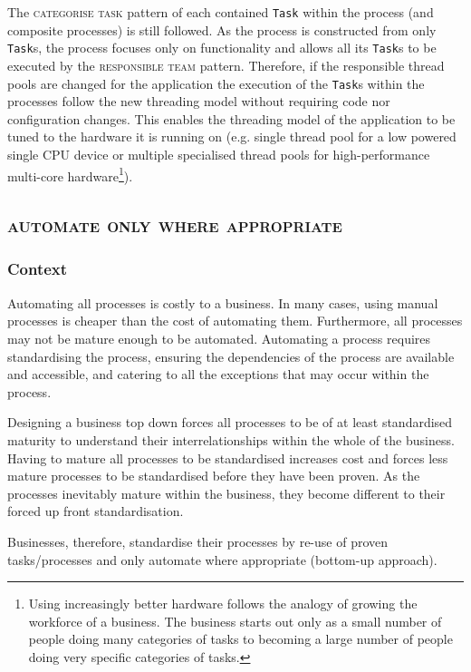 \documentclass[prodmode]{style/acmlarge}
\begin{document}
The \textsc{categorise task} pattern of each contained \texttt{Task} within the
process (and composite processes) is still followed.  As the process is
constructed from only \texttt{Task}s, the process focuses only on functionality
and allows all its \texttt{Task}s to be executed by the \textsc{responsible
team} pattern.  Therefore, if the responsible thread pools are changed for the
application the execution of the \texttt{Task}s within the processes follow the new
threading model without requiring code nor configuration changes.  This enables
the threading model of the application to be tuned to the hardware it is running
on (e.g. single thread pool for a low powered single CPU device or multiple
specialised thread pools for high-performance multi-core hardware\footnote{Using
increasingly better hardware follows the analogy of growing the workforce of a
business.  The business starts out only as a small number of people doing many
categories of tasks to becoming a large number of people doing very specific
categories of tasks.}).



\subsection{\textsc{\textbf{automate only where appropriate}}}

\subsubsection*{Context} Automating all processes is costly to a business.  In
many cases, using manual processes is cheaper than the cost of automating them.
Furthermore, all processes may not be mature enough to be automated.  Automating
a process requires standardising the process, ensuring the dependencies of the
process are available and accessible, and catering to all the exceptions that
may occur within the process.

Designing a business top down forces all processes to be of at least
standardised maturity to understand their interrelationships within the whole of
the business.  Having to mature all processes to be standardised increases cost
and forces less mature processes to be standardised before they have been
proven.  As the processes inevitably mature within the business, they become
different to their forced up front standardisation.

Businesses, therefore, standardise their processes by re-use of proven
tasks/processes and only automate where appropriate (bottom-up approach).
\end{document}
